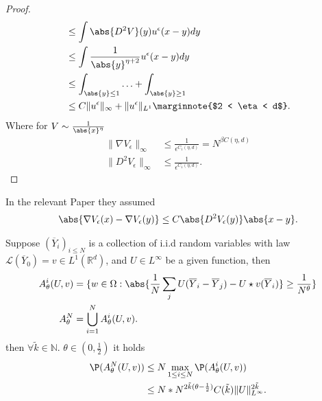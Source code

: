 \begin{proof}
\begin{align*}
                                              &\le  \int  \abs{D^2V}(y)u^{\epsilon}(x-y)dy \\
                                              &\le  \int \frac{1}{\abs{y}^{\eta  + 2} } u^{\epsilon}(x-y)dy\\
                                              &\le  \int_{\abs{y} \le 1} \ldots  + \int_{\abs{y}\ge 1} \\
                                              &\le C\|u^{\epsilon} \|_{\infty}+\|u^{\epsilon} \|_{L^{1} } \marginnote{$2 < \eta  < d$}
.\end{align*}
Where for $V \sim \frac{1}{\abs{x}^{\eta } }$
\begin{align*}
  \|\nabla V_\epsilon\|_{\infty} &\le  \frac{1}{\epsilon ^{C_{1}(\eta ,d)} } = N^{\beta C(\eta ,d)} \\
  \|D^2 V_\epsilon\|_{\infty} &\le  \frac{1}{\epsilon ^{C_{1}(\eta ,d)} }
.\end{align*}
\end{proof}
\begin{remark}
 In the relevant Paper   they assumed 
 \begin{align*}
   \abs{\nabla V_{\epsilon}(x) - \nabla V_{\epsilon}(y)} \le  C \abs{D^{2} V_{\epsilon}(y) }\abs{x-y}
 .\end{align*}
\end{remark}
\begin{lemma}[A version of l.l.n]\label{version_of_lln}
  Suppose $(\overline{Y}_i )_{i \le N}$ is a collection of i.i.d random variables with law $\mathcal{L}(\overline{Y}_0) = v \in  L^{1}(\mathbb{R}^{d} ) $,
  and $U \in  L^{\infty} $ be a given function, then 
  \begin{align*}
    A_{\theta }^{i} (U,v) &= \{w \in  \Omega  : \abs{\frac{1}{N} \sum_{j} U(\overline{Y}_i - \overline{Y}_j  )- U \star  v (\overline{Y}_i )} \ge \frac{1}{N^{\theta} }\}  \\
    A_{\theta }^{N} &= \bigcup_{i=1}^{N}   A_{\theta }^{i} (U,v)
  .\end{align*}
  then $\forall  \tilde{k} \in  \mathbb{N} $. $\theta \in  (0,\frac{1}{2})$ it holds 
  \begin{align*}
    \P(A_{\theta }^{N}(U,v) ) &\le N \max_{1\le i \le  N} \P(A_{\theta }^{i}(U,v) )\\
                              &\le N * N^{2 \tilde{k}(\theta  - \frac{1}{2}) }  C(\tilde{k} ) \|U\|_{L^{\infty} }^{2 \tilde{k} } 
  .\end{align*}
\end{lemma}
